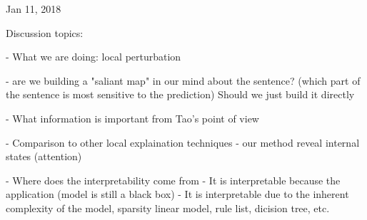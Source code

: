 
Jan 11, 2018

Discussion topics:

- What we are doing: local perturbation

- are we building a "saliant map" in our mind about the sentence?
  (which part of the sentence is most sensitive to the prediction)
  Should we just build it directly

- What information is important from Tao's point of view

- Comparison to other local explaination techniques
    - our method reveal internal states (attention)

- Where does the interpretability come from
    - It is interpretable because the application (model is still a black box)
    - It is interpretable due to the inherent complexity of
      the model, sparsity linear model, rule list, dicision tree, etc.
